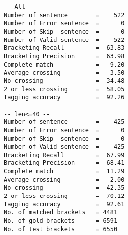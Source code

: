 \scriptsize
\begin{verbatim}
-- All --
Number of sentence        =    522
Number of Error sentence  =      0
Number of Skip  sentence  =      0
Number of Valid sentence  =    522
Bracketing Recall         =  63.83
Bracketing Precision      =  63.98
Complete match            =   9.20
Average crossing          =   3.50
No crossing               =  34.48
2 or less crossing        =  58.05
Tagging accuracy          =  92.26

-- len<=40 --
Number of sentence        =    425
Number of Error sentence  =      0
Number of Skip  sentence  =      0
Number of Valid sentence  =    425
Bracketing Recall         =  67.99
Bracketing Precision      =  68.41
Complete match            =  11.29
Average crossing          =   2.00
No crossing               =  42.35
2 or less crossing        =  70.12
Tagging accuracy          =  92.61
No. of matched brackets   = 4481
No. of gold brackets      = 6591
No. of test brackets      = 6550
\end{verbatim}

\normalsize

